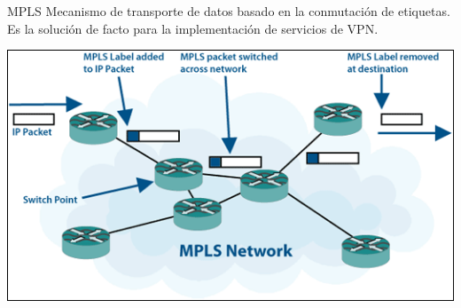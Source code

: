 \documentclass[xcolor=svgnames]{beamer}
\begin{document}
\begin{frame}{MPLS}
	Mecanismo de transporte de datos basado en la conmutación de etiquetas. Es la solución de facto para la implementación de servicios de VPN.
	\begin{center}
		\includegraphics[scale=0.6]{mpls}
	\end{center}
\end{frame}
\end{document}
